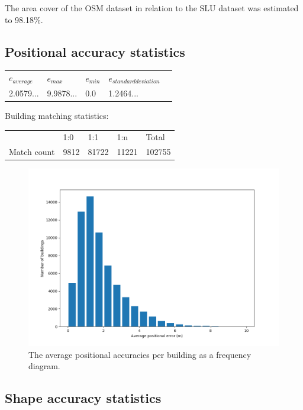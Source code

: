 \documentclass[a4paper]{article}
\begin{document}
The area cover of the OSM dataset in relation to the SLU dataset was estimated to 98.18\%.

\subsection{Positional accuracy statistics}

\begin{table}[H]
\begin{tabular}{lllll}
    $e_{average}$ & $e_{max}$ & $e_{min}$ & $e_{standard deviation}$ \\
    2.0579... & 9.9878... & 0.0 & 1.2464...
\end{tabular}
\end{table}

Building matching statistics:

\begin{table}[H]
\begin{tabular}{lllll}
    & 1:0 & 1:1 & 1:n & Total \\
    Match count & 9812 & 81722 & 11221 & 102755
\end{tabular}
\end{table}


\begin{figure}[H]
    \centering
    \includegraphics[width=\textwidth,height=0.5\textheight,keepaspectratio]{img_pos_error_plot}
    \caption{The average positional accuracies per building as a frequency diagram.}
    \label{fig:space}
\end{figure}

\subsection{Shape accuracy statistics}
\end{document}
